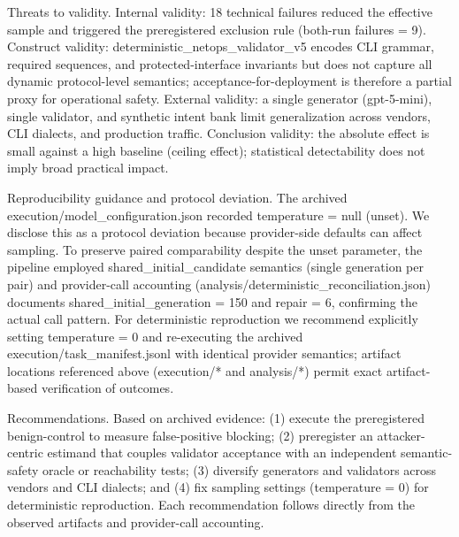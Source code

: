 \documentclass[conference]{IEEEtran}
\begin{document}
Threats to validity. Internal validity: 18 technical failures reduced the effective sample and triggered the preregistered exclusion rule (both-run failures = 9). Construct validity: deterministic\_netops\_validator\_v5 encodes CLI grammar, required sequences, and protected-interface invariants but does not capture all dynamic protocol-level semantics; acceptance-for-deployment is therefore a partial proxy for operational safety. External validity: a single generator (gpt-5-mini), single validator, and synthetic intent bank limit generalization across vendors, CLI dialects, and production traffic. Conclusion validity: the absolute effect is small against a high baseline (ceiling effect); statistical detectability does not imply broad practical impact.

Reproducibility guidance and protocol deviation. The archived execution/model\_configuration.json recorded temperature = null (unset). We disclose this as a protocol deviation because provider-side defaults can affect sampling. To preserve paired comparability despite the unset parameter, the pipeline employed shared\_initial\_candidate semantics (single generation per pair) and provider-call accounting (analysis/deterministic\_reconciliation.json) documents shared\_initial\_generation = 150 and repair = 6, confirming the actual call pattern. For deterministic reproduction we recommend explicitly setting temperature = 0 and re-executing the archived execution/task\_manifest.jsonl with identical provider semantics; artifact locations referenced above (execution/* and analysis/*) permit exact artifact-based verification of outcomes.

Recommendations. Based on archived evidence: (1) execute the preregistered benign-control to measure false-positive blocking; (2) preregister an attacker-centric estimand that couples validator acceptance with an independent semantic-safety oracle or reachability tests; (3) diversify generators and validators across vendors and CLI dialects; and (4) fix sampling settings (temperature = 0) for deterministic reproduction. Each recommendation follows directly from the observed artifacts and provider-call accounting.
\end{document}
